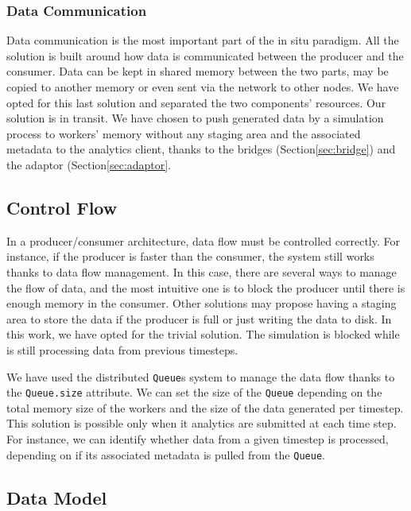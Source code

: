 \subsubsection{Data Communication}\label{sec:DandCcomm:data}
Data communication is the most important part of the in situ paradigm. All the solution is built around how data is communicated between the producer and the consumer. 
Data can be kept in shared memory between the two parts, may be copied to another memory or even sent via the network to other nodes. 
We have opted for this last solution and separated the two components' resources. Our solution is in transit. 
We have chosen to push generated data by a simulation process to \dask workers' memory without any staging area and the associated metadata to the analytics client, thanks to the bridges (Section\ref{sec:bridge}) and the adaptor (Section\ref{sec:adaptor}.

\subsection{Control Flow}\label{sec:dataflow}

In a producer/consumer architecture, data flow must be controlled correctly. For instance, if the producer is faster than the consumer, the system still works thanks to data flow management. In this case, there are several ways to manage the flow of data, and the most intuitive one is to block the producer until there is enough memory in the consumer. Other solutions may propose having a staging area to store the data if the producer is full or just writing the data to disk. 
In this work, we have opted for the trivial solution. The simulation is blocked while \dask is still processing data from previous timesteps.  

We have used the \dask distributed \texttt{Queue}s system to manage the data flow thanks to the \texttt{Queue.size} attribute. We can set the size of the \texttt{Queue} depending on the total memory size of the workers and the size of the data generated per timestep. This solution is possible only when it analytics are submitted at each time step. For instance, we can identify whether data from a given timestep is processed, depending on if its associated metadata is pulled from the \texttt{Queue}. 

\subsection{Data Model}\label{sec:btpImp:datamodel}

